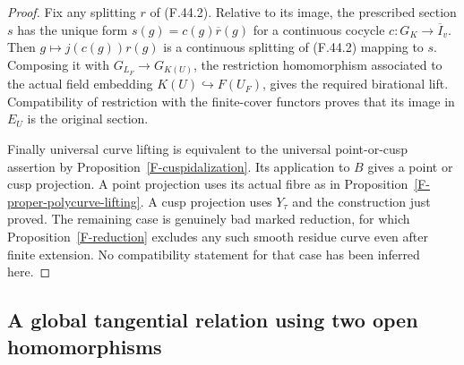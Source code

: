 \documentclass[11pt,oneside]{article}
\begin{document}
\begin{proof}
Fix any splitting $r$ of (F.44.2). Relative to its
image, the prescribed section $s$ has the unique form
$s(g)=c(g)\overline r(g)$ for a continuous cocycle
$c:G_K\to\overline I_v$. Then
$g\mapsto j(c(g))r(g)$ is a continuous splitting of
(F.44.2) mapping to $s$. Composing it with
$G_{L_F}\to G_{K(U)}$, the restriction homomorphism
associated to the actual field embedding
$K(U)\hookrightarrow F(U_F)$, gives the required
birational lift. Compatibility of restriction with
the finite-cover functors proves that its image in
$E_U$ is the original section.

Finally universal curve lifting is equivalent to the
universal point-or-cusp assertion by
Proposition~\ref{F-cuspidalization}. Its application to
$B$ gives a point or cusp projection. A point projection
uses its actual fibre as in
Proposition~\ref{F-proper-polycurve-lifting}. A cusp
projection uses $Y_\tau$ and the construction just
proved. The remaining case is genuinely bad marked
reduction, for which Proposition~\ref{F-reduction}
excludes any such smooth residue curve even after
finite extension. No compatibility statement for that
case has been inferred here.
\end{proof}

\subsection{A global tangential relation using two open homomorphisms}
\end{document}
